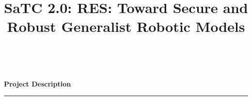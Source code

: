 \documentclass[11pt,letterpaper]{article}
\begin{document}
\pagestyle{empty} 


\setlength{\baselineskip}{12.6pt} %
\setlength{\normalbaselineskip}{12.6pt} %
\title{\Large
SaTC 2.0: RES: Toward Secure and Robust Generalist Robotic  Models} 
\begin{center}
   {\bfseries\filcenter} ~\vspace{2ex}
   {\Large\bfseries\filcenter
Project Description
\\\rule{\textwidth}{0.4pt}}
\end{center}









%
%
%


\newpage{}
\renewcommand\refname{References Cited}





\newpage{}


\newpage{}


\newpage{}


\newpage{}


\newpage{}


\newpage{}

\end{document}
